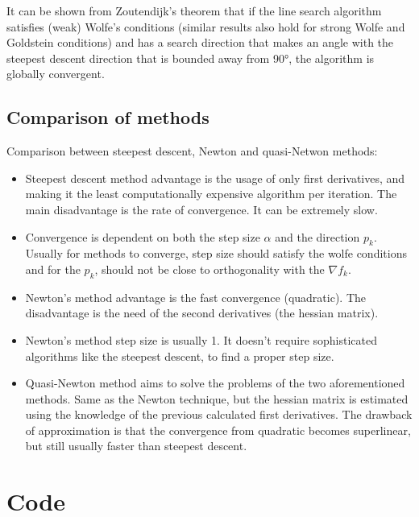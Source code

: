 \documentclass[a4paper,11pt]{article}
\numberwithin{equation}{section} %
\begin{document}
It can be shown from Zoutendijk's theorem that if the line search algorithm satisfies (weak) Wolfe's conditions (similar results also hold for strong Wolfe and Goldstein conditions) and has a search direction that makes an angle with the steepest descent direction that is bounded away from 90°, the algorithm is globally convergent. 

\subsection{Comparison of methods}

Comparison between steepest descent, Newton and quasi-Netwon methods:

\begin{itemize}
    \item Steepest descent method advantage is the usage of only first derivatives, and making it the least computationally expensive algorithm per iteration. The main disadvantage is the rate of convergence. It can be extremely slow.

    \item Convergence is dependent on both the step size $\alpha$ and the direction $p_k$. Usually for methods to converge, step size should satisfy the wolfe conditions and for the $p_k$, should not be close to orthogonality with the $\nabla f_k$.
    
    \item Newton's method advantage is the fast convergence (quadratic). The disadvantage is the need of the second derivatives (the hessian matrix). 
    
    \item Newton's method step size is usually 1. It doesn't require sophisticated algorithms like the steepest descent, to find a proper step size.
    
    \item Quasi-Newton method aims to solve the problems of the two aforementioned methods. Same as the Newton technique, but the hessian matrix is estimated using the knowledge of the previous calculated first derivatives. The drawback of approximation is that the convergence from quadratic becomes superlinear, but still usually faster than steepest descent.
    
\end{itemize}

\label{code}
\section{Code}
\end{document}
